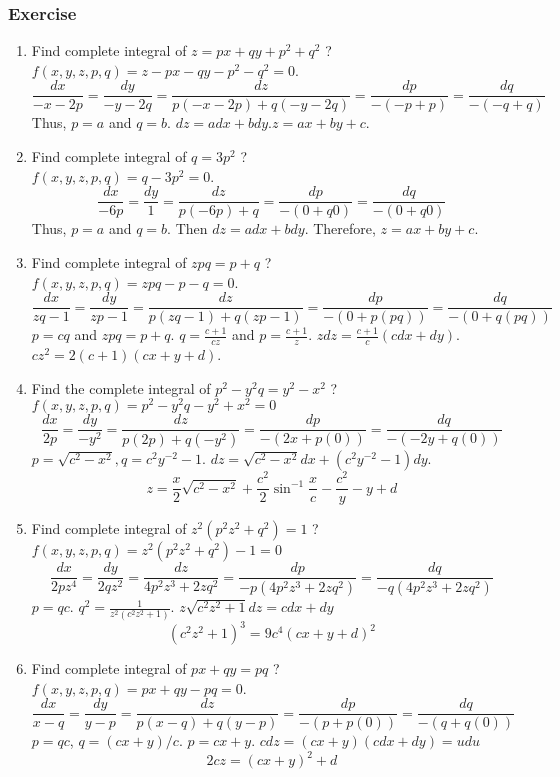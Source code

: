 \subsubsection*{Exercise}
\begin{enumerate}
	\item Find complete integral of $z = px + qy + p^2 + q^2$ ?\\ $f(x,y,z,p,q) = z - px - qy - p^2 - q^2 = 0$.
	$$\frac{dx}{-x-2p} = \frac{dy}{-y-2q} = \frac{dz}{p(-x-2p) + q(-y-2q)} = \frac{dp}{-(-p+p)} = \frac{dq}{-(-q+q)}$$
	Thus, $p = a$ and $q = b$. $dz = adx + bdy$.$z = ax + by + c$.
\item Find complete integral of $q = 3p^2$ ?\\ $f(x,y,z,p,q) = q-3p^2 = 0$.
	$$\frac{dx}{-6p} = \frac{dy}{1} = \frac{dz}{p(-6p)+q} = \frac{dp}{-(0+q0)} = \frac{dq}{-(0+q0)}$$
	Thus, $p = a$ and $q = b$. Then $dz = adx + bdy$. Therefore, $z = ax + by + c$.
\item Find complete integral of $zpq = p+q$ ?\\ $f(x,y,z,p,q) = zpq - p - q = 0$.
	$$\frac{dx}{zq - 1} = \frac{dy}{zp - 1} = \frac{dz}{p(zq-1)+q(zp-1)} = \frac{dp}{-(0+p(pq))} = \frac{dq}{-(0+q(pq))}$$
		$p = cq$ and $zpq = p + q$. $q = \frac{c + 1}{cz}$ and $p = \frac{c+1}{z}$. $zdz = \frac{c+1}{c} (cdx + dy)$.\\ $cz^2 = 2(c+1)(cx + y + d)$.
	\item Find the complete integral of $p^2 - y^2q = y^2 - x^2$ ?\\ $f(x,y,z,p,q) = p^2 - y^2q - y^2 + x^2 = 0$
	$$\frac{dx}{2p} = \frac{dy}{-y^2} = \frac{dz}{p(2p)+q(-y^2)} = \frac{dp}{-(2x+p(0))} = \frac{dq}{-(-2y+q(0))}$$
	$p = \sqrt{c^2-x^2}, q = c^2y^{-2}-1$. $dz = \sqrt{c^2-x^2} dx + (c^2y^{-2} -1)dy$.
		$$z = \frac{x}{2} \sqrt{c^2 - x^2} + \frac{c^2}{2} \sin^{-1} \frac{x}{c} - \frac{c^2}{y} - y + d$$
	\item Find complete integral of $z^2(p^2z^2+q^2) = 1$ ?\\
	$f(x,y,z,p,q) = z^2(p^2z^2+q^2)-1 = 0$
		$$\frac{dx}{2pz^4} = \frac{dy}{2qz^2} = \frac{dz}{4p^2z^3+2zq^2} = \frac{dp}{-p(4p^2z^3+2zq^2)} = \frac{dq}{-q(4p^2z^3+2zq^2)}$$
		$p = qc$. $q^2 = \frac{1}{z^2(c^2z^2+1)}$. $z\sqrt{c^2z^2+1}dz = c dx + dy$
		$$(c^2z^2+1)^3  = 9c^4(cx + y + d)^2$$
	\item Find complete integral of $px + qy = pq$ ?\\
	$f(x,y,z,p,q) = px + qy - pq = 0$.
		$$\frac{dx}{x-q} = \frac{dy}{y-p} = \frac{dz}{p(x-q)+q(y-p)} = \frac{dp}{-(p+p(0))} = \frac{dq}{-(q+q(0))}$$
		$p = qc$, $q = (cx+y)/c$. $p = cx+y$. $cdz = (cx+y)(cdx + dy) = udu$
		$$2cz = (cx+y)^2 + d$$
\end{enumerate}

